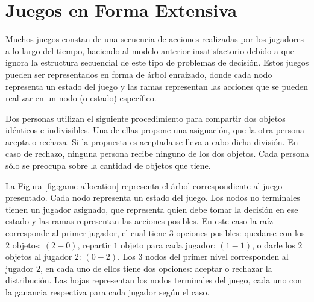 \chapter{Juegos en Forma Extensiva}
\label{chapter:juegos-forma-extensiva}

Muchos juegos constan de una secuencia de acciones realizadas por los jugadores a lo largo del tiempo, haciendo al modelo anterior insatisfactorio debido a que ignora la estructura secuencial de este tipo de problemas de decisión. Estos juegos pueden ser representados en forma de árbol enraizado, donde cada nodo representa un estado del juego y las ramas representan las acciones que se pueden realizar en un nodo (o estado) específico. 

\begin{example}
\label{ex:game-allocation}
Dos personas utilizan el siguiente procedimiento para compartir dos objetos idénticos e indivisibles. Una de ellas propone una asignación, que la otra persona acepta o rechaza. Si la propuesta es aceptada se lleva a cabo dicha división. En caso de rechazo, ninguna persona recibe ninguno de los dos objetos. Cada persona sólo se preocupa sobre la cantidad de objetos que tiene. 
\end{example}

La Figura \ref{fig:game-allocation} representa el árbol correspondiente al juego presentado. Cada nodo representa un estado del juego. Los nodos no terminales tienen un jugador asignado, que representa quien debe tomar la decisión en ese estado y las ramas representan las acciones posibles. En este caso la raíz corresponde al primer jugador, el cual tiene $3$ opciones posibles: quedarse con los $2$ objetos: $(2-0)$, repartir $1$ objeto para cada jugador: $(1-1)$, o darle los $2$ objetos al jugador $2$: $(0-2)$. Los $3$ nodos del primer nivel corresponden al jugador $2$, en cada uno de ellos tiene dos opciones: aceptar o rechazar la distribución. Las hojas representan los nodos terminales del juego, cada uno con la ganancia respectiva para cada jugador según el caso.

